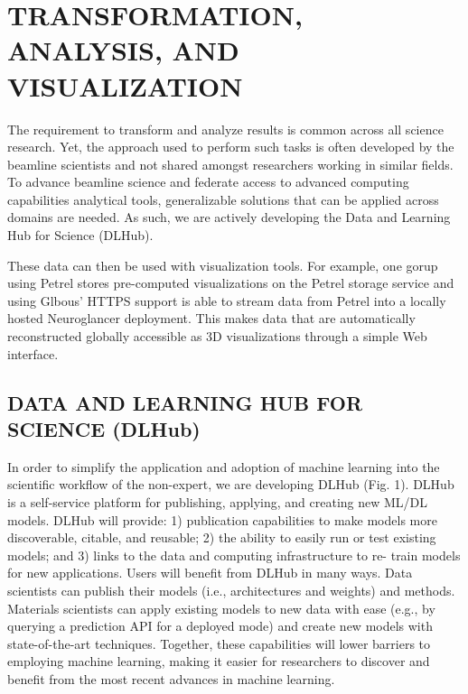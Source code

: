 \documentclass{aip-cp}
\newcommand\ryan[1]{}
\newcommand\kyle[1]{}
\newcommand\ryan[1]{{\color{green}[Ryan: #1]}}
\newcommand\kyle[1]{{\color{purple}[Kyle: #1]}}
\begin{document}
\kyle{Ryan another APS/ALS flow?}



\section{TRANSFORMATION, ANALYSIS, AND VISUALIZATION}
\ryan{Broader with DLhub as the focus.}

The requirement to transform and analyze results is common across all science research. Yet, the 
approach used to perform such tasks is often developed by the beamline scientists and not shared 
amongst researchers working in similar fields. To advance beamline science and federate access to 
advanced computing capabilities analytical tools, generalizable solutions that can be applied 
across domains are needed. As such, we are actively developing the Data and Learning Hub for 
Science (DLHub). 

These data can then be used with visualization tools. For example, one gorup using Petrel stores 
pre-computed visualizations on the Petrel storage service and using Glbous' HTTPS support is able 
to stream data from Petrel into a locally hosted Neuroglancer deployment. This makes data that are 
automatically reconstructed globally accessible as 3D 
visualizations through a simple Web interface.





\subsection{DATA AND LEARNING HUB FOR SCIENCE (DLHub)}


In order to simplify the application and adoption of machine learning into the
scientific workflow of the non-expert, we are developing DLHub (Fig. 1). DLHub
is a self-service platform for publishing, applying, and creating new ML/DL
models. DLHub will provide: 1) publication capabilities to make models more
discoverable, citable, and reusable; 2) the ability to easily run or test
existing models; and 3) links to the data and computing infrastructure to re-
train models for new applications. Users will benefit from DLHub in many ways.
Data scientists can publish their models (i.e., architectures and weights) and
methods. Materials scientists can apply existing models to new data with ease
(e.g., by querying a prediction API for a deployed mode) and create new models
with state-of-the-art techniques. Together, these capabilities will lower
barriers to employing machine learning, making it easier for researchers to
discover and benefit from the most recent advances in machine learning.
\end{document}
